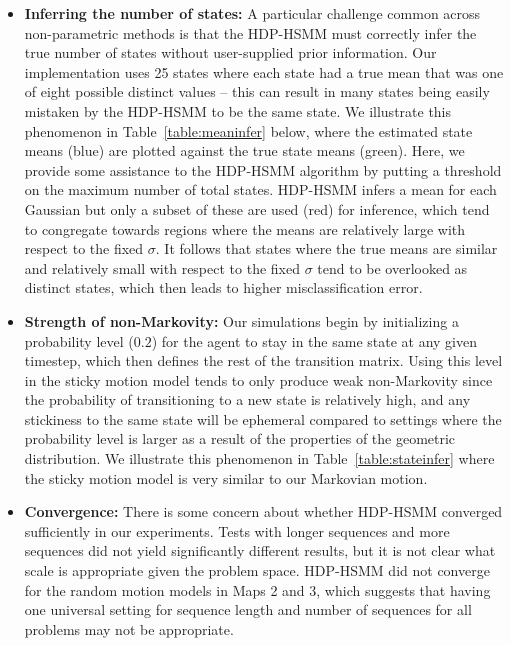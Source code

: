\documentclass{article}
\begin{document}
\begin{itemize}
  \item \textbf{Inferring the number of states:} A particular challenge common across non-parametric methods is that the HDP-HSMM must correctly infer the true number of states without user-supplied prior information. Our implementation uses 25 states where each state had a true mean that was one of eight possible distinct values -- this can result in many states being easily mistaken by the HDP-HSMM to be the same state. We illustrate this phenomenon in Table~\ref{table:meaninfer} below, where the estimated state means (blue) are plotted against the true state means (green). Here, we provide some assistance to the HDP-HSMM algorithm by putting a threshold on the maximum number of total states. HDP-HSMM infers a mean for each Gaussian but only a subset of these are used (red) for inference, which tend to congregate towards regions where the means are relatively large with respect to the fixed $\sigma$. It follows that states where the true means are similar and relatively small with respect to the fixed $\sigma$ tend to be overlooked as distinct states, which then leads to higher misclassification error.
  \item \textbf{Strength of non-Markovity:} Our simulations begin by initializing a probability level ($0.2$) for the agent to stay in the same state at any given timestep, which then defines the rest of the transition matrix. Using this level in the sticky motion model tends to only produce weak non-Markovity since the probability of transitioning to a new state is relatively high, and any stickiness to the same state will be ephemeral compared to settings where the probability level is larger as a result of the properties of the geometric distribution. We illustrate this phenomenon in Table~\ref{table:stateinfer} where the sticky motion model is very similar to our Markovian motion.
  \item \textbf{Convergence:} There is some concern about whether HDP-HSMM converged sufficiently in our experiments. Tests with longer sequences and more sequences did not yield significantly different results, but it is not clear what scale is appropriate given the problem space. HDP-HSMM did not converge for the random motion models in Maps 2 and 3, which suggests that having one universal setting for sequence length and number of sequences for all problems may not be appropriate.
\end{itemize}
\end{document}
